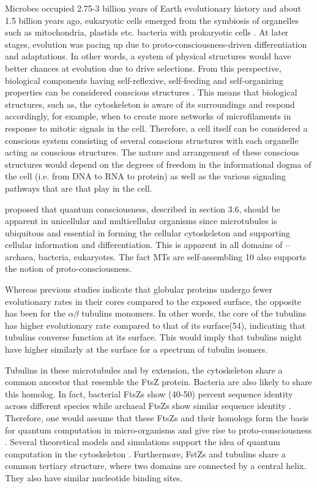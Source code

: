\documentclass[letterpaper,final,times]{cas-dc}
\numberwithin{equation}{section}
\begin{document}
Microbes occupied 2.75-3 billion years of Earth evolutionary history\citep{44} and about 1.5 billion years ago, eukaryotic cells emerged from the symbiosis of organelles such as mitochondria, plastids etc. bacteria with prokaryotic cells \citep{45}. At later stages, evolution was pacing up due to proto-consciousness-driven differentiation and adaptations\citep{46}. In other words, a system of physical structures would have better chances at evolution due to drive selections. From this perspective, biological components having self-reflexive, self-feeding and self-organizing properties can be considered conscious
structures \citep{39}. This means that biological structures, such as, the cytoskeleton is aware of its surroundings and respond accordingly, for example, when to create more networks of microfilaments in response to mitotic signals in the cell. Therefore, a cell itself can be considered a conscious system consisting of several conscious structures\citep{39} with each organelle acting as conscious structures. The nature and arrangement of these conscious structures would depend on the degrees of freedom in the informational dogma of the cell (i.e. from DNA to RNA to protein) as well as the various signaling pathways that are that play in the cell.

\citet{39} proposed that quantum consciousness, described in section 3.6, should be apparent in unicellular and multicellular organisms since microtubules is ubiquitous and essential in forming the cellular
cytoskeleton and supporting cellular information and differentiation. This is apparent in all domains of – archaea, bacteria, eukaryotes. The fact MTs are self-assembling 10 also supports the notion of proto-consciousness.

Whereas previous studies indicate that globular proteins undergo fewer evolutionary rates in their cores compared to the exposed surface, the opposite has been for the $\alpha\beta$ tubulins monomers\citep{55}. In other words, the core of the tubulins has higher evolutionary rate compared to that of its surface(54), indicating that tubulins converse function at its surface. This would imply that tubulins might have higher similarly at the surface for a spectrum of tubulin isomers.

Tubulins in these microtubules and by extension, the cytoskeleton share a common ancestor that resemble the FtsZ protein\citep{47}. Bacteria are also likely to share this homolog\citep{48}. In fact, bacterial FtsZs show (40-50) percent sequence identity across different species while archaeal FtsZs show similar sequence identity \citep{49}. Therefore, one would assume that these FtsZs and their homologs form the basis for quantum computation in micro-organisms and give rise to proto-consciousness \citep{10}. Several theoretical models and simulations support the idea of quantum computation in the cytoskeleton \citep{8, 50, 51, 52, 53}. Furthermore, FstZs and tubulins share a common tertiary structure, where two domains are connected by a central helix. They also have similar nucleotide binding sites.
\end{document}
